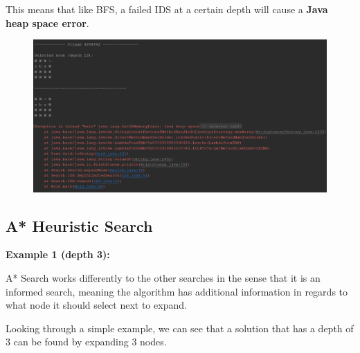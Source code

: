\documentclass{article}
\begin{document}
	\newpage
	This means that like BFS, a failed IDS at a certain depth will cause a \textbf{Java heap space error}.
	
	\begin{figure}[h]
		\centering
		\includegraphics[height=0.43\textheight]{IDS-2-2.png}
	\end{figure}
	
	\newpage
	\subsection{A* Heuristic Search}
	\textbf{Example 1 (depth 3):}
	
	A* Search works differently to the other searches in the sense that it is an informed search, meaning the algorithm has additional information in regards to what node it should select next to expand.
	
	Looking through a simple example, we can see that a solution that has a depth of 3 can be found by expanding 3 nodes.
	
\end{document}
